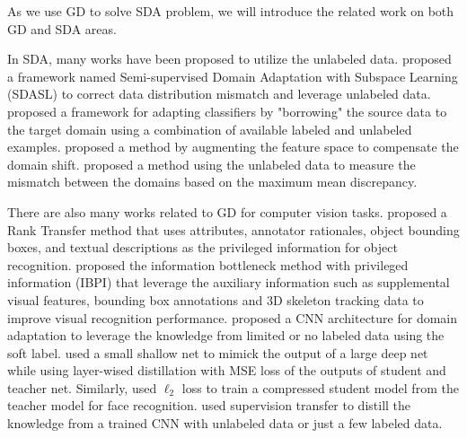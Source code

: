 As we use GD to solve SDA problem, we will introduce the related work on both GD and SDA areas.

In SDA, many works have been proposed to utilize the unlabeled data.  \cite{yao2015semi} proposed a framework named Semi-supervised Domain Adaptation with Subspace Learning (SDASL) to correct data distribution mismatch and leverage unlabeled data. \cite{Donahue_2013_CVPR} proposed a framework for adapting classifiers by "borrowing" the source data to the target domain using a combination of available labeled and unlabeled examples. \cite{daume2010frustratingly} proposed a method by augmenting the feature space to compensate the domain shift. \cite{duan2012visual} proposed a method using the unlabeled data to measure the mismatch between the domains based on the maximum mean discrepancy.

There are also many works related to GD for computer vision tasks. \cite{Sharmanska_2013_ICCV} proposed a Rank Transfer method that uses attributes, annotator
rationales, object bounding boxes, and textual descriptions as the privileged information for object recognition. \cite{Motiian_2016_CVPR} proposed {the information bottleneck method with privileged information (IBPI)} that leverage the auxiliary information such as supplemental visual features, bounding box annotations and 3D skeleton tracking data to improve visual recognition performance. \cite{Tzeng_2015_ICCV} proposed a CNN architecture for domain adaptation to leverage the knowledge from limited or no labeled data using the soft label. \cite{urban2016deep} used a small shallow net to mimick the output of a large deep net while using layer-wised distillation with MSE loss of the outputs of student and teacher net. Similarly, \cite{luo2016face} used $\ell_2$ loss to train a compressed student model from the teacher model for face recognition. \cite{Gupta_2016_CVPR} used supervision transfer to distill the knowledge from a trained CNN with unlabeled data or just a few labeled data.